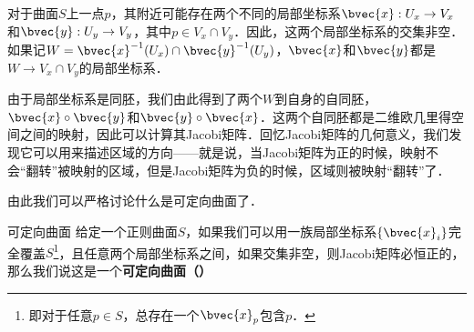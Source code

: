 
对于曲面$S$上一点$p$，其附近可能存在两个不同的局部坐标系$\bvec{x}:U_x\to V_x$和$\bvec{y}:U_y\to V_y$，其中$p\in V_x\cap V_y$．因此，这两个局部坐标系的交集非空．如果记$W=\bvec{x}^{-1}(U_x)\cap\bvec{y}^{-1}(U_y)$，$\bvec{x}$和$\bvec{y}$都是$W\to V_x\cap V_y$的局部坐标系．

由于局部坐标系是同胚，我们由此得到了两个$W$到自身的自同胚，$\bvec{x}\circ\bvec{y}$和$\bvec{y}\circ\bvec{x}$．这两个自同胚都是二维欧几里得空间之间的映射，因此可以计算其Jacobi矩阵．回忆Jacobi矩阵的几何意义，我们发现它可以用来描述区域的方向——就是说，当Jacobi矩阵为正的时候，映射不会“翻转”被映射的区域，但是Jacobi矩阵为负的时候，区域则被映射“翻转”了．

由此我们可以严格讨论什么是可定向曲面了．

\begin{definition}{可定向曲面}
给定一个正则曲面$S$，如果我们可以用一族局部坐标系$\{\bvec{x}_i\}$完全覆盖$S$\footnote{即对于任意$p\in S$，总存在一个$\bvec{x}_p$包含$p$．}，且任意两个局部坐标系之间，如果交集非空，则Jacobi矩阵必恒正的，那么我们说这是一个\textbf{可定向曲面（）}
\end{definition}







